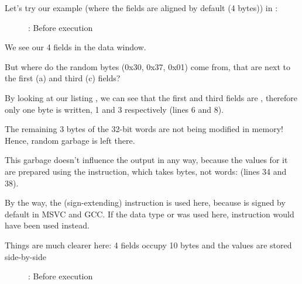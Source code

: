 ﻿\clearpage
{}
\myindex{\olly}

Let's try our example (where the fields are aligned by default (4 bytes)) in \olly:

\begin{figure}[H]
\centering
{}
\caption{\olly: Before \printf execution}
\label{fig:packing_olly_4}
\end{figure}

We see our 4 fields in the data window.

But where do the random bytes (0x30, 0x37, 0x01) come from, that are next to the first (a) and third (c) fields?

By looking at our listing , we can see that the first and third fields
are \Tchar, therefore only one byte is written, 1 and 3 respectively (lines 6 and 8).

The remaining 3 bytes of the 32-bit words are not being modified in memory!
Hence, random garbage is left there.

This garbage doesn't influence the \printf output in any way, because the values for it are prepared
using the \MOVSX instruction, which takes bytes, not words: 
 (lines 34 and 38).

By the way, the \MOVSX (sign-extending) instruction is used here, because 
\Tchar is signed by default in MSVC and GCC.
If the  data type or  was used here, 
\MOVZX instruction would have been used instead.

\clearpage
{}
\myindex{\olly}

Things are much clearer here: 4 fields occupy 10 bytes and the values are stored side-by-side

\begin{figure}[H]
\centering
{}
\caption{\olly: Before \printf execution}
\label{fig:packing_olly_1}
\end{figure}
